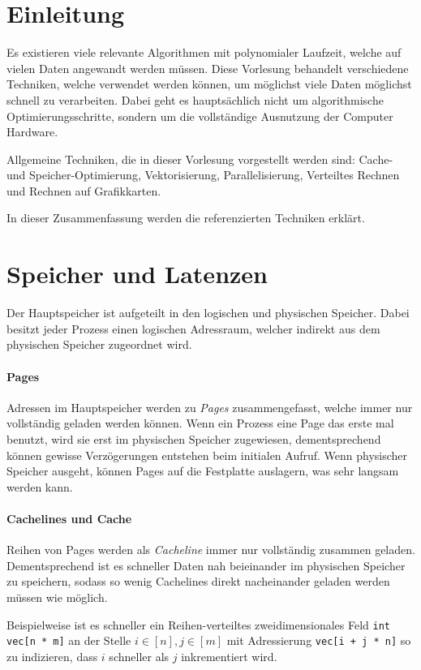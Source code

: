 \section*{Einleitung}
Es existieren viele relevante Algorithmen mit polynomialer Laufzeit, welche auf vielen Daten angewandt werden müssen.
Diese Vorlesung behandelt verschiedene Techniken, welche verwendet werden können, um möglichst viele Daten möglichst schnell zu verarbeiten.
Dabei geht es hauptsächlich nicht um algorithmische Optimierungsschritte, sondern um die vollständige Ausnutzung der Computer Hardware.

Allgemeine Techniken, die in dieser Vorlesung vorgestellt werden sind: Cache- und Speicher-Optimierung, Vektorisierung, Parallelisierung, Verteiltes Rechnen und Rechnen auf Grafikkarten.

In dieser Zusammenfassung werden die referenzierten Techniken erklärt.

\section{Speicher und Latenzen}
Der Hauptspeicher ist aufgeteilt in den logischen und physischen Speicher.
Dabei besitzt jeder Prozess einen logischen Adressraum, welcher indirekt aus dem physischen Speicher zugeordnet wird.

\paragraph{Pages}
Adressen im Hauptspeicher werden zu \emph{Pages} zusammengefasst, welche immer nur vollständig geladen werden können.
Wenn ein Prozess eine Page das erste mal benutzt, wird sie erst im physischen Speicher zugewiesen, dementsprechend können gewisse Verzögerungen entstehen beim initialen Aufruf.
Wenn physischer Speicher ausgeht, können Pages auf die Festplatte auslagern, was sehr langsam werden kann.

\paragraph{Cachelines und Cache}
Reihen von Pages werden als \emph{Cacheline} immer nur vollständig zusammen geladen.
Dementsprechend ist es schneller Daten nah beieinander im physischen Speicher zu speichern, sodass so wenig Cachelines direkt nacheinander geladen werden müssen wie möglich.

Beispielweise ist es schneller ein Reihen-verteiltes zweidimensionales Feld \lstinline|int vec[n * m]| an der Stelle \(i \in [n], j \in [m]\) mit Adressierung \lstinline|vec[i + j * n]| so zu indizieren, dass \(i\) schneller als \(j\) inkrementiert wird.

